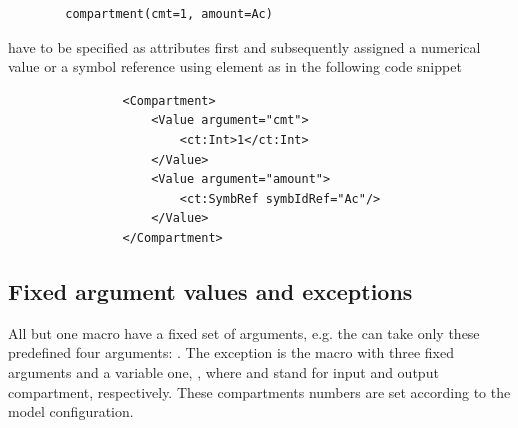 \begin{itemize}
\begin{lstlisting}
		compartment(cmt=1, amount=Ac)
\end{lstlisting}
 \lstset{language=XML}
have to be specified as attributes first and subsequently assigned a numerical value 
or a symbol reference using element  as in the following code snippet
\begin{lstlisting}
                <Compartment>
                    <Value argument="cmt">
                        <ct:Int>1</ct:Int>
                    </Value>
                    <Value argument="amount">
                        <ct:SymbRef symbIdRef="Ac"/>
                    </Value>
                </Compartment>
\end{lstlisting}
\end{itemize}


%


\subsection{Fixed argument values and exceptions}
\label{subsec:fixedArguments}
All but one macro have a fixed set of arguments, e.g. the  can take only these predefined
four arguments: . The exception is the  macro with three fixed
arguments  and a variable one, , where  and
 stand for input and output compartment, respectively. These compartments numbers are set 
according to the model configuration. 


